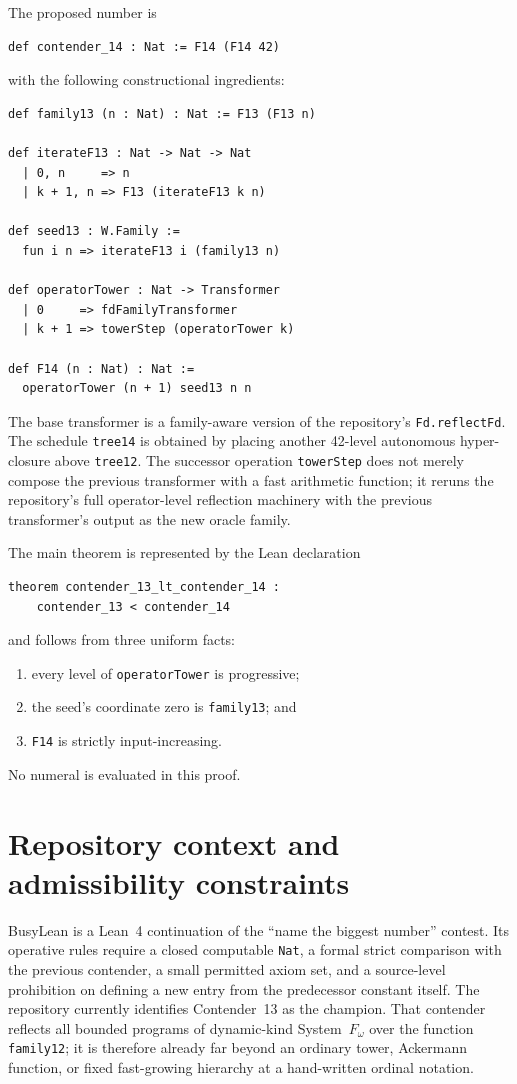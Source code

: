 \documentclass[11pt]{article}
\theoremstyle{definition}
\newcommand{\lean}[1]{\texttt{#1}}
\begin{document}
The proposed number is
\begin{lstlisting}
def contender_14 : Nat := F14 (F14 42)
\end{lstlisting}
with the following constructional ingredients:
\begin{lstlisting}
def family13 (n : Nat) : Nat := F13 (F13 n)

def iterateF13 : Nat -> Nat -> Nat
  | 0, n     => n
  | k + 1, n => F13 (iterateF13 k n)

def seed13 : W.Family :=
  fun i n => iterateF13 i (family13 n)

def operatorTower : Nat -> Transformer
  | 0     => fdFamilyTransformer
  | k + 1 => towerStep (operatorTower k)

def F14 (n : Nat) : Nat :=
  operatorTower (n + 1) seed13 n n
\end{lstlisting}
The base transformer is a family-aware version of the repository's
\lean{Fd.reflectFd}.  The schedule \lean{tree14} is obtained by placing another
42-level autonomous hyper-closure above \lean{tree12}.  The successor operation
\lean{towerStep} does not merely compose the previous transformer with a fast
arithmetic function; it reruns the repository's full operator-level reflection
machinery with the previous transformer's output as the new oracle family.

The main theorem is represented by the Lean declaration
\begin{lstlisting}
theorem contender_13_lt_contender_14 :
    contender_13 < contender_14
\end{lstlisting}
and follows from three uniform facts:
\begin{enumerate}[label=(\roman*)]
  \item every level of \lean{operatorTower} is progressive;
  \item the seed's coordinate zero is \lean{family13}; and
  \item \lean{F14} is strictly input-increasing.
\end{enumerate}
No numeral is evaluated in this proof.

\section{Repository context and admissibility constraints}

BusyLean is a Lean~4 continuation of the ``name the biggest number'' contest.
Its operative rules require a closed computable \lean{Nat}, a formal strict
comparison with the previous contender, a small permitted axiom set, and a
source-level prohibition on defining a new entry from the predecessor constant
itself.  The repository currently identifies Contender~13 as the champion.
That contender reflects all bounded programs of dynamic-kind System~$F_\omega$
over the function \lean{family12}; it is therefore already far beyond an
ordinary tower, Ackermann function, or fixed fast-growing hierarchy at a
hand-written ordinal notation.
\end{document}
